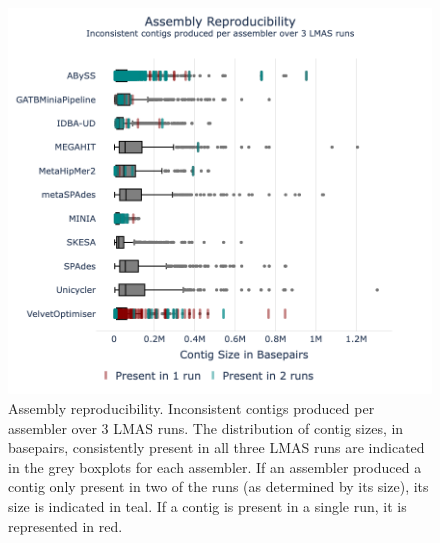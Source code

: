 \begin{figure}[h!]
\centering
\includegraphics[width=\textwidth]{figures/chapter 5/Figure 3.png}
\caption{Assembly reproducibility. Inconsistent contigs produced per assembler over 3 LMAS runs. The distribution of contig sizes, in basepairs, consistently present in all three LMAS runs are indicated in the grey boxplots for each assembler. If an assembler produced a contig only present in two of the runs (as determined by its size), its size is indicated in teal. If a contig is present in a single run, it is represented in red.}
\label{fig:chap5_figure3}
\end{figure}

